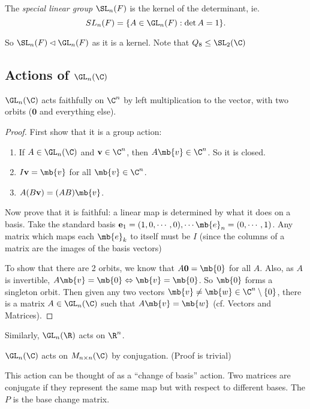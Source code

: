 \documentclass[a4paper]{article}
\begin{document}
\begin{defi}
  The \emph{special linear group} $\SL_n(F)$ is the kernel of the determinant, ie.
  \[
    SL_n(F) = \{A\in \GL_n(F): \det A = 1\}.
  \]
\end{defi}

So $\SL_n(F)\lhd \GL_n(F)$ as it is a kernel. Note that $Q_8\leq \SL_2(\C)$
\subsection{Actions of \texorpdfstring{$\GL_n(\C)$}{GLn(C)}}
\begin{prop}
  $\GL_n(\C)$ acts faithfully on $\C^n$ by left multiplication to the vector, with two orbits ($\mathbf{0}$ and everything else).
\end{prop}

\begin{proof}
  First show that it is a group action:
  \begin{enumerate}[label=\arabic{*}.]
      \setcounter{enumi}{0}
    \item If $A\in \GL_n(\C)$ and $\mathbf{v}\in \C^n$, then $A\mb{v}\in \C^n$. So it is closed.
    \item $I\mathbf{v} = \mb{v}$ for all $\mb{v}\in \C^n$.
    \item $A(B\mathbf{v}) = (AB)\mb{v}$.
  \end{enumerate}

  Now prove that it is faithful: a linear map is determined by what it does on a basis. Take the standard basis $\mathbf{e}_1 = (1, 0, \cdots, 0), \cdots \mb{e}_n = (0, \cdots, 1)$. Any matrix which maps each $\mb{e}_k$ to itself must be $I$ (since the columns of a matrix are the images of the basis vectors)

  To show that there are 2 orbits, we know that $A\mathbf{0} = \mb{0}$ for all $A$. Also, as $A$ is invertible, $A\mb{v} = \mb{0}\Leftrightarrow \mb{v} = \mb{0}$. So $\mb{0}$ forms a singleton orbit. Then given any two vectors $\mb{v}\not= \mb{w}\in \C^n\setminus\{0\}$, there is a matrix $A\in \GL_n(\C)$ such that $A\mb{v} = \mb{w}$ (cf. Vectors and Matrices).
\end{proof}

Similarly, $\GL_n(\R)$ acts on $\R^n$.

\begin{prop}
  $\GL_n(\C)$ acts on $M_{n\times n}(\C)$ by conjugation. (Proof is trivial)
\end{prop}
This action can be thought of as a ``change of basis'' action. Two matrices are conjugate if they represent the same map but with respect to different bases. The $P$ is the base change matrix.
\end{document}

